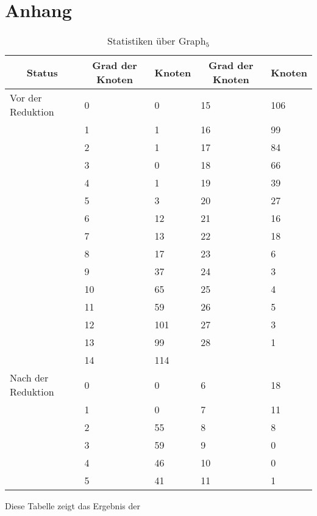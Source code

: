 \chapter{Anhang}
\label{ch:Anhang}

\begin{table}[htb]
\caption{Statistiken über Graph$_{5}$\label{tab:graph4}}
\vspace*{1em}
\centering

\bgroup
\def\arraystretch{1.3}%

\begin{threeparttable}

\begin{tabular}[c]{ l  l  l | l  l}
	\hline
	\multicolumn{1}{c}{\textbf{Status}} & 
	\multicolumn{1}{c}{\textbf{Grad der Knoten}} & 
	\multicolumn{1}{c|}{\textbf{Knoten}} &
	\multicolumn{1}{c}{\textbf{Grad der Knoten}} & 
	\multicolumn{1}{c}{\textbf{Knoten}}\\
	
	\hline
		
	Vor der Reduktion & 0 & 0 &15  & 106 \\
	& 1 & 1 & 16&99 \\
	& 2 & 1 & 17& 84\\
	& 3 & 0 & 18& 66\\
	& 4 & 1 & 19& 39\\
	& 5 & 3 & 20& 27\\
	& 6 & 12 & 21& 16\\
	& 7 & 13 & 22& 18\\
	&  8& 17 & 23& 6\\
	&  9& 37 & 24& 3\\
	&  10& 65 & 25& 4\\
	&  11& 59 & 26& 5\\
	&  12& 101 & 27& 3\\
	&  13& 99 & 28& 1\\
	&  14& 114 & & \\
	
	\hline

	Nach der Reduktion & 0 & 0 & 6 & 18 \\
	& 1 & 0 & 7 & 11 \\
	& 2 & 55 & 8 & 8 \\
	& 3 & 59 & 9 & 0 \\
	& 4 & 46 & 10 & 0 \\
	& 5 & 41 & 11 & 1 \\
	
	\hline
	
\end{tabular}
\begin{tablenotes}\footnotesize
\item Diese Tabelle zeigt das Ergebnis der
\end{tablenotes}

\end{threeparttable}

\egroup

\end{table}